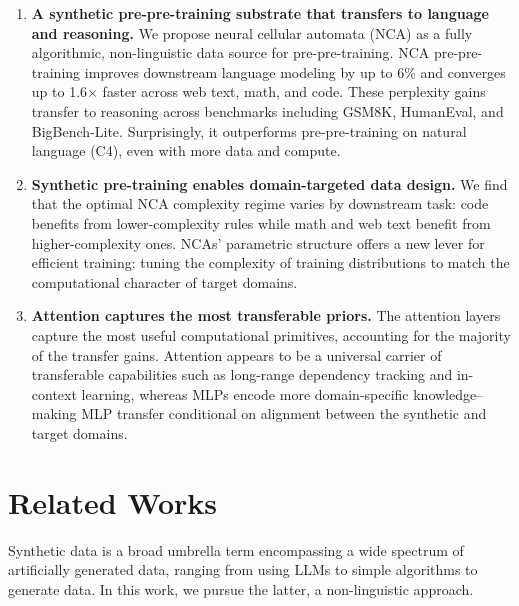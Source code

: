 \documentclass{article}
\theoremstyle{plain}
\theoremstyle{definition}
\theoremstyle{remark}
\begin{document}
\begin{enumerate}
    \item \textbf{A synthetic pre-pre-training substrate that transfers to language and reasoning.}
    We propose neural cellular automata (NCA) as a fully algorithmic, non-linguistic data source for pre-pre-training. NCA pre-pre-training improves downstream language modeling by up to 6\% and converges up to 1.6$\times$ faster across web text, math, and code. These perplexity gains transfer to reasoning across benchmarks including GSM8K, HumanEval, and BigBench-Lite. Surprisingly, it outperforms pre-pre-training on natural language (C4), even with more data and compute.
    \item{\textbf{Synthetic pre-training enables domain-targeted data design.}}
We find that the optimal NCA complexity regime varies by downstream task: code benefits from lower-complexity rules while math and web text benefit from higher-complexity ones. NCAs' parametric structure offers a new lever for efficient training: tuning the complexity of training distributions to match the computational character of target domains.
    \item \textbf{Attention captures the  most transferable priors.}
 The attention layers capture the most useful computational primitives, accounting for the majority of the transfer gains. Attention appears to be a universal carrier of transferable capabilities such as long-range dependency tracking and in-context learning, whereas MLPs encode more domain-specific knowledge--making MLP transfer conditional on alignment between the synthetic and target domains. 
 


\end{enumerate}


\section{Related Works}

Synthetic data is a broad umbrella term encompassing a wide spectrum of artificially generated data, ranging from using LLMs \citep{Nad__2025,wang2023selfinstructaligninglanguagemodels, xu2025wizardlmempoweringlargepretrained, mukherjee2023orcaprogressivelearningcomplex, li2023textbooksneediiphi15, lu2024mathgeniegeneratingsyntheticdata, wei2019edaeasydataaugmentation} to simple algorithms to generate data.
In this work, we pursue the latter, a non-linguistic approach.
\end{document}
